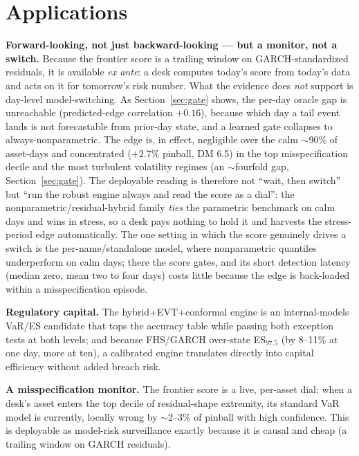 \documentclass[11pt]{article}
\theoremstyle{remark}
\begin{document}
\section{Applications}\label{sec:applications}

\textbf{Forward-looking, not just backward-looking --- but a monitor, not
a switch.} Because the frontier score is a trailing window on
GARCH-standardized residuals, it is available \emph{ex ante}: a desk
computes today's score from today's data and acts on it for tomorrow's
risk number. What the evidence does \emph{not} support is day-level
model-switching. As Section~\ref{sec:gate} shows, the per-day oracle gap
is unreachable (predicted-edge correlation $+0.16$), because which day a
tail event lands is not forecastable from prior-day state, and a learned
gate collapses to always-nonparametric. The edge is, in effect,
negligible over the calm $\sim$90\% of asset-days and concentrated
($+2.7\%$ pinball, DM 6.5) in the top misspecification decile and the
most turbulent volatility regimes (an $\sim$fourfold gap,
Section~\ref{sec:gate}). The deployable reading is therefore not ``wait,
then switch'' but ``run the robust engine always and read the score as a
dial'': the nonparametric/residual-hybrid family \emph{ties} the
parametric benchmark on calm days and wins in stress, so a desk pays
nothing to hold it and harvests the stress-period edge automatically. The
one setting in which the score genuinely drives a switch is the
per-name/standalone model, where nonparametric quantiles underperform on
calm days; there the score gates, and its short detection latency
(median zero, mean two to four days) costs little because the edge is
back-loaded within a misspecification episode.

\textbf{Regulatory capital.} The hybrid$+$EVT$+$conformal engine is an
internal-models VaR/ES candidate that tops the accuracy table while
passing both exception tests at both levels; and because FHS/GARCH
over-state ES$_{97.5}$ (by 8--11\% at one day, more at ten), a
calibrated engine translates directly into capital efficiency without
added breach risk.

\textbf{A misspecification monitor.} The frontier score is a live,
per-asset dial: when a desk's asset enters the top decile of
residual-shape extremity, its standard VaR model is currently,
locally wrong by $\sim$2--3\% of pinball with high confidence. This is
deployable as model-risk surveillance exactly because it is causal and
cheap (a trailing window on GARCH residuals).
\end{document}
